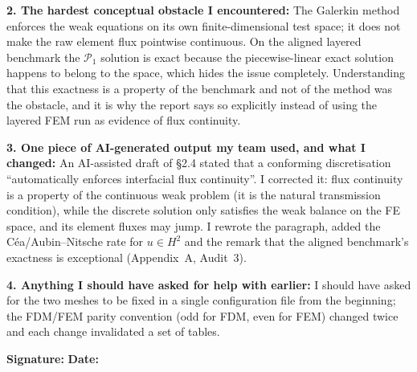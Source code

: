\begin{formbox}
\textbf{2. The hardest conceptual obstacle I encountered:}
The Galerkin method enforces the weak equations on its own finite-dimensional
test space; it does not make the raw element flux pointwise continuous. On the
aligned layered benchmark the $\mathcal P_1$ solution is exact because the
piecewise-linear exact solution happens to belong to the space, which hides the
issue completely. Understanding that this exactness is a property of the
benchmark and not of the method was the obstacle, and it is why the report says
so explicitly instead of using the layered FEM run as evidence of flux
continuity.

\textbf{3. One piece of AI-generated output my team used, and what I changed:}
An AI-assisted draft of \S2.4 stated that a conforming discretisation
``automatically enforces interfacial flux continuity''. I corrected it: flux
continuity is a property of the continuous weak problem (it is the natural
transmission condition), while the discrete solution only satisfies the weak
balance on the FE space, and its element fluxes may jump. I rewrote the
paragraph, added the C\'ea/Aubin--Nitsche rate for $u\in H^2$ and the remark
that the aligned benchmark's exactness is exceptional (Appendix~A, Audit~3).

\textbf{4. Anything I should have asked for help with earlier:}
I should have asked for the two meshes to be fixed in a single configuration
file from the beginning; the FDM/FEM parity convention (odd for FDM, even for
FEM) changed twice and each change invalidated a set of tables.

\textbf{Signature:} \underline{\hspace{4.2cm}} \hfill
\textbf{Date:} \underline{\hspace{2.2cm}}
\end{formbox}
